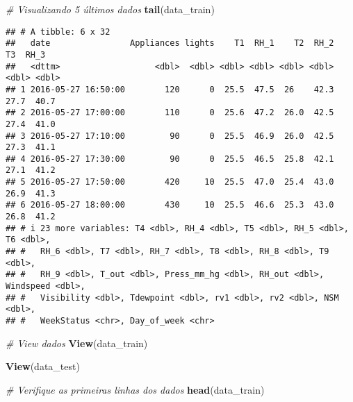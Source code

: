 \documentclass[
]{article}
\newenvironment{Shaded}{\begin{snugshade}}{\end{snugshade}}
\newcommand{\CommentTok}[1]{\textcolor[rgb]{0.56,0.35,0.01}{\textit{#1}}}
\newcommand{\FunctionTok}[1]{\textcolor[rgb]{0.13,0.29,0.53}{\textbf{#1}}}
\newcommand{\NormalTok}[1]{#1}
\begin{document}
\begin{Shaded}
\begin{Highlighting}[]
\CommentTok{\# Visualizando 5 últimos dados}
\FunctionTok{tail}\NormalTok{(data\_train)}
\end{Highlighting}
\end{Shaded}

\begin{verbatim}
## # A tibble: 6 x 32
##   date                Appliances lights    T1  RH_1    T2  RH_2    T3  RH_3
##   <dttm>                   <dbl>  <dbl> <dbl> <dbl> <dbl> <dbl> <dbl> <dbl>
## 1 2016-05-27 16:50:00        120      0  25.5  47.5  26    42.3  27.7  40.7
## 2 2016-05-27 17:00:00        110      0  25.6  47.2  26.0  42.5  27.4  41.0
## 3 2016-05-27 17:10:00         90      0  25.5  46.9  26.0  42.5  27.3  41.1
## 4 2016-05-27 17:30:00         90      0  25.5  46.5  25.8  42.1  27.1  41.2
## 5 2016-05-27 17:50:00        420     10  25.5  47.0  25.4  43.0  26.9  41.3
## 6 2016-05-27 18:00:00        430     10  25.5  46.6  25.3  43.0  26.8  41.2
## # i 23 more variables: T4 <dbl>, RH_4 <dbl>, T5 <dbl>, RH_5 <dbl>, T6 <dbl>,
## #   RH_6 <dbl>, T7 <dbl>, RH_7 <dbl>, T8 <dbl>, RH_8 <dbl>, T9 <dbl>,
## #   RH_9 <dbl>, T_out <dbl>, Press_mm_hg <dbl>, RH_out <dbl>, Windspeed <dbl>,
## #   Visibility <dbl>, Tdewpoint <dbl>, rv1 <dbl>, rv2 <dbl>, NSM <dbl>,
## #   WeekStatus <chr>, Day_of_week <chr>
\end{verbatim}

\begin{Shaded}
\begin{Highlighting}[]
\CommentTok{\# View dados}
\FunctionTok{View}\NormalTok{(data\_train)}
\end{Highlighting}
\end{Shaded}

\begin{Shaded}
\begin{Highlighting}[]
\FunctionTok{View}\NormalTok{(data\_test)}
\end{Highlighting}
\end{Shaded}

\begin{Shaded}
\begin{Highlighting}[]
\CommentTok{\# Verifique as primeiras linhas dos dados}
\FunctionTok{head}\NormalTok{(data\_train)}
\end{Highlighting}
\end{Shaded}
\end{document}
